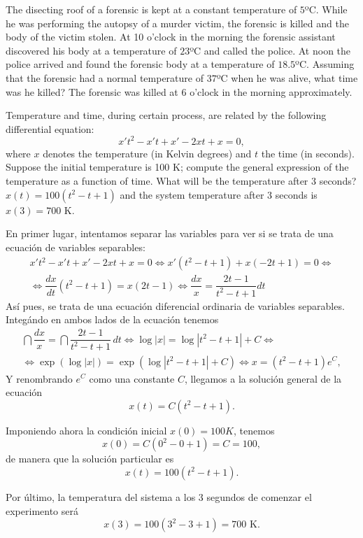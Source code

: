 {The disecting roof of a forensic is kept at a constant temperature of $5$ºC.
While he was performing the autopsy of a murder victim, the forensic is killed and the body of the victim stolen.
At 10 o'clock in the morning the forensic assistant discovered his body at a temperature of $23$ºC and called the police.
At noon the police arrived and found the forensic body at a temperature of $18.5$ºC.
Assuming that the forensic had a normal temperature of $37$ºC when he was alive, what time was he killed?
}
{
The forensic was killed at 6 o'clock in the morning approximately.
}
{
}


{Temperature and time, during certain process, are related by the following differential equation:
\[
x't^2-x't+x'-2xt+x=0,
\]
where $x$ denotes the temperature (in Kelvin degrees) and $t$ the time (in seconds).
Suppose the initial temperature is 100 K; compute the general expression of the temperature as a function of time. What will be the temperature after 3 seconds?}
{$x(t)=100(t^2-t+1)$ and the system temperature after 3 seconds is $x(3)=700$ K.
}
{En primer lugar, intentamos separar las variables para ver si se trata de una ecuación de variables separables:
\[\renewcommand{\arraystretch}{2}
\begin{array}{c}
x't^2  - x't + x' - 2xt + x = 0 \Leftrightarrow x'(t^2-t+1)+x(-2t+1)=0 \Leftrightarrow\\
\Leftrightarrow \dfrac{dx}{dt}(t^2-t+1)=x(2t-1) \Leftrightarrow \dfrac{dx}{x}=\dfrac{2t-1}{t^2-t+1} dt
\end{array}
\]
Así pues, se trata de una ecuación diferencial ordinaria de variables separables. Integándo en ambos lados de la
ecuación tenemos
\[\renewcommand{\arraystretch}{2}
\begin{array}{c}
\dint \dfrac{dx}{x}=\dint \dfrac{2t-1}{t^2-t+1}\,dt \Leftrightarrow \log |x|= \log |t^2-t+1|+C \Leftrightarrow \\
\Leftrightarrow \exp(\log |x| )= \exp(\log |t^2-t+1|+C) \Leftrightarrow x=(t^2-t+1)e^C,
\end{array}
\]
Y renombrando $e^C$ como una constante $C$, llegamos a la solución general de la ecuación
\[
x(t)=C(t^2-t+1).
\]

Imponiendo ahora la condición inicial $x(0)=100 K$, tenemos
\[
x(0)=C(0^2-0+1)=C=100,
\]
de manera que la solución particular es
\[
x(t)=100(t^2-t+1).
\]

Por último, la temperatura del sistema a los 3 segundos de comenzar el experimento será
\[
x(3)=100(3^2-3+1)=700\textrm{ K}.
\]
}


